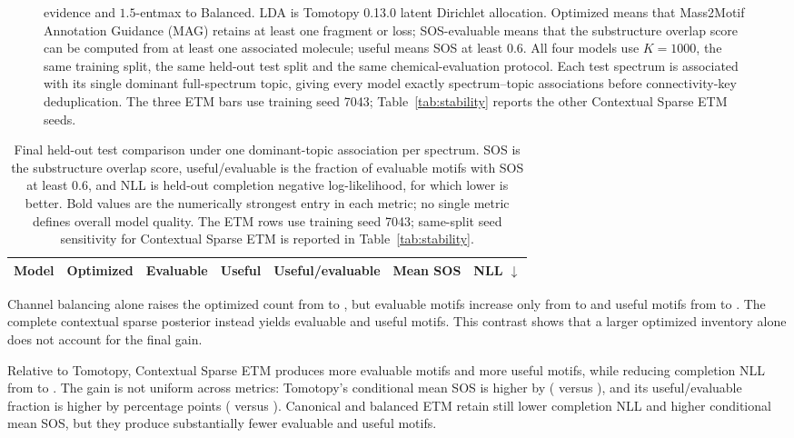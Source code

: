 \documentclass[10pt,a4paper]{article}
\begin{document}
\begin{figure}[H]
{evidence and $1.5$-entmax to Balanced. LDA is Tomotopy 0.13.0 latent Dirichlet
allocation. Optimized means that Mass2Motif Annotation Guidance (MAG) retains
at least one fragment or loss;
SOS-evaluable means that the substructure overlap score can be computed from at
least one associated molecule; useful means SOS at least 0.6. All four models
use $K=1000$, the same training split, the same held-out test split and the same
chemical-evaluation protocol. Each test spectrum is associated with its single
dominant full-spectrum topic, giving every model exactly \TestSpectra{}
spectrum--topic associations before connectivity-key deduplication. The three
ETM bars use training seed 7043; Table~\ref{tab:stability} reports the other
Contextual Sparse ETM seeds.}
\label{fig:inventory}
\end{figure}

\begin{table}[H]
\centering
\small
\caption{Final held-out test comparison under one dominant-topic association per
spectrum. SOS is the substructure overlap score, useful/evaluable is the
fraction of evaluable motifs with SOS at least 0.6, and NLL is held-out
completion negative log-likelihood, for which lower is better. Bold values are
the numerically strongest entry in each metric; no single metric defines
overall model quality. The ETM rows use training seed 7043; same-split seed
sensitivity for Contextual Sparse ETM is reported in
Table~\ref{tab:stability}.}
\label{tab:test-comparison}
\begin{tabular}{@{}lrrrrrr@{}}
\toprule
Model & Optimized & Evaluable & Useful & Useful/evaluable & Mean SOS & NLL $\downarrow$ \\
\midrule

\end{tabular}
\end{table}

Channel balancing alone raises the optimized count from
\CanonicalOptimized{} to \BalancedOptimized{}, but evaluable motifs increase
only from \CanonicalEvaluable{} to \BalancedEvaluable{} and useful motifs from
\CanonicalUseful{} to \BalancedUseful{}. The complete contextual sparse
posterior instead yields \ContextualEvaluable{} evaluable and
\ContextualUseful{} useful motifs. This contrast shows that a larger optimized
inventory alone does not account for the final gain.

Relative to Tomotopy, Contextual Sparse ETM produces
\ContextualEvaluableGainVsTomotopy{} more evaluable motifs and
\ContextualUsefulGainVsTomotopy{} more useful motifs, while reducing completion
NLL from \TomotopyNLL{} to \ContextualNLL{}. The gain is not uniform across
metrics: Tomotopy's conditional mean SOS is higher by
\ContextualMeanSOSDifferenceVsTomotopy{} (\TomotopyMeanSOS{} versus
\ContextualMeanSOS{}), and its useful/evaluable fraction is higher by
\ContextualUsefulRateDifferenceVsTomotopy{} percentage points
(\TomotopyUsefulRate{} versus \ContextualUsefulRate{}). Canonical and balanced
ETM retain still lower completion NLL and higher conditional mean SOS, but they
produce substantially fewer evaluable and useful motifs.
\end{document}
